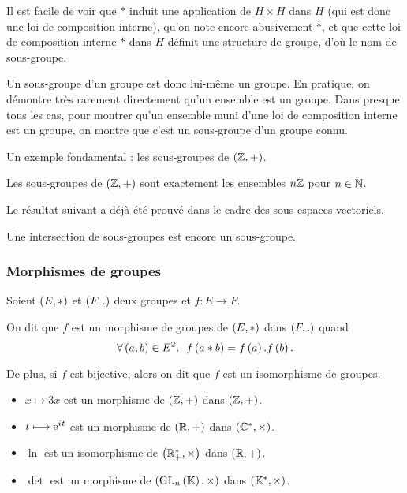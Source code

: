 Il est facile de voir que \(*\) induit une application de \(H\times H\) dans \(H\) (qui est donc une loi de composition interne), qu'on note encore abusivement \(*\), et que cette loi de composition interne \(*\) dans \(H\) définit une structure de groupe, d'où le nom de sous-groupe.

Un sous-groupe d'un groupe est donc lui-même un groupe. En pratique, on démontre très rarement directement qu'un ensemble est un groupe. Dans presque tous les cas, pour montrer qu'un ensemble muni d'une loi de composition interne est un groupe, on montre que c'est un sous-groupe d'un groupe connu.

Un exemple fondamental : les sous-groupes de \(\groupe{\Z}\).

\begin{prop}
Les sous-groupes de \(\groupe{\Z}\) sont exactement les ensembles \(n\mathbb{Z}\) pour \(n\in\mathbb{N}\).
\end{prop}

Le résultat suivant a déjà été prouvé dans le cadre des sous-espaces vectoriels.

\begin{prop}
Une intersection de sous-groupes est encore un sous-groupe.
\end{prop}

\subsubsection{Morphismes de groupes}

\begin{defi}
Soient \(\groupe{E}[*]\) et \(\groupe{F}[.]\) deux groupes et \(f:E\to F\).

On dit que \(f\) est un morphisme de groupes de \(\groupe{E}[*]\) dans \(\groupe{F}[.]\) quand \[\quantifs{\forall\paren{a,b}\in E^2}f\paren{a*b}=f\paren{a}.f\paren{b}.\]

De plus, si \(f\) est bijective, alors on dit que \(f\) est un isomorphisme de groupes.
\end{defi}

\begin{ex}
\begin{itemize}
    \item \(x\mapsto3x\) est un morphisme de \(\groupe{\Z}\) dans \(\groupe{\Z}\). \\
    \item \(t\longmapsto\mathrm{e}^{i\mkern1mu t}\) est un morphisme de \(\groupe{\R}\) dans \(\groupe{\Cs}[\times]\). \\
    \item \(\ln\) est un isomorphisme de \(\groupe{\Rps}[\times]\) dans \(\groupe{\R}\). \\
    \item \(\det\) est un morphisme de \(\groupe{\GL{n}[\K]}[\times]\) dans \(\groupe{\Ks}[\times]\).
\end{itemize}
\end{ex}

